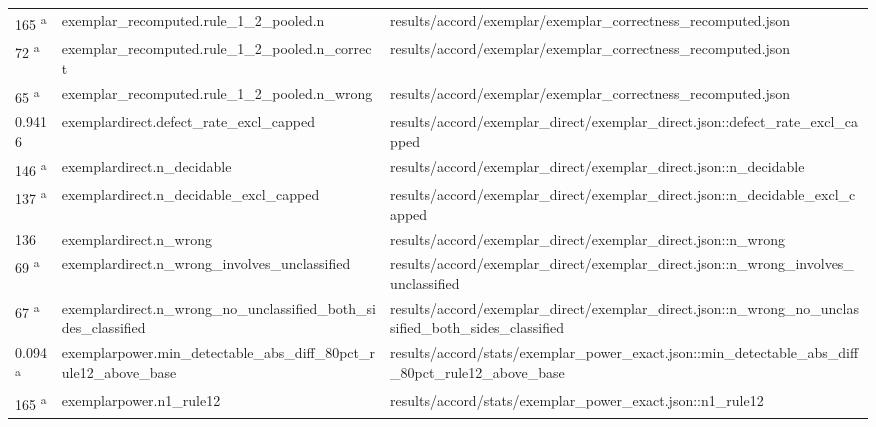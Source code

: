 \begin{longtable}{@{}p{0.7in}p{1.9in}p{2.6in}@{}}
165 \textsuperscript{a} & exemplar\_recomputed.\allowbreak{}rule\_1\_2\_pooled.\allowbreak{}n & results/\allowbreak{}accord/\allowbreak{}exemplar/\allowbreak{}exemplar\_correctness\_recomputed.\allowbreak{}json\\
72 \textsuperscript{a} & exemplar\_recomputed.\allowbreak{}rule\_1\_2\_pooled.\allowbreak{}n\_correct & results/\allowbreak{}accord/\allowbreak{}exemplar/\allowbreak{}exemplar\_correctness\_recomputed.\allowbreak{}json\\
65 \textsuperscript{a} & exemplar\_recomputed.\allowbreak{}rule\_1\_2\_pooled.\allowbreak{}n\_wrong & results/\allowbreak{}accord/\allowbreak{}exemplar/\allowbreak{}exemplar\_correctness\_recomputed.\allowbreak{}json\\
0.9416 & exemplardirect.\allowbreak{}defect\_rate\_excl\_capped & results/\allowbreak{}accord/\allowbreak{}exemplar\_direct/\allowbreak{}exemplar\_direct.\allowbreak{}json::defect\_rate\_excl\_capped\\
146 \textsuperscript{a} & exemplardirect.\allowbreak{}n\_decidable & results/\allowbreak{}accord/\allowbreak{}exemplar\_direct/\allowbreak{}exemplar\_direct.\allowbreak{}json::n\_decidable\\
137 \textsuperscript{a} & exemplardirect.\allowbreak{}n\_decidable\_excl\_capped & results/\allowbreak{}accord/\allowbreak{}exemplar\_direct/\allowbreak{}exemplar\_direct.\allowbreak{}json::n\_decidable\_excl\_capped\\
136 & exemplardirect.\allowbreak{}n\_wrong & results/\allowbreak{}accord/\allowbreak{}exemplar\_direct/\allowbreak{}exemplar\_direct.\allowbreak{}json::n\_wrong\\
69 \textsuperscript{a} & exemplardirect.\allowbreak{}n\_wrong\_involves\_unclassified & results/\allowbreak{}accord/\allowbreak{}exemplar\_direct/\allowbreak{}exemplar\_direct.\allowbreak{}json::n\_wrong\_involves\_unclassified\\
67 \textsuperscript{a} & exemplardirect.\allowbreak{}n\_wrong\_no\_unclassified\_both\_sides\_classified & results/\allowbreak{}accord/\allowbreak{}exemplar\_direct/\allowbreak{}exemplar\_direct.\allowbreak{}json::n\_wrong\_no\_unclassified\_both\_sides\_classified\\
0.094 \textsuperscript{a} & exemplarpower.\allowbreak{}min\_detectable\_abs\_diff\_80pct\_rule12\_above\_base & results/\allowbreak{}accord/\allowbreak{}stats/\allowbreak{}exemplar\_power\_exact.\allowbreak{}json::min\_detectable\_abs\_diff\_80pct\_rule12\_above\_base\\
165 \textsuperscript{a} & exemplarpower.\allowbreak{}n1\_rule12 & results/\allowbreak{}accord/\allowbreak{}stats/\allowbreak{}exemplar\_power\_exact.\allowbreak{}json::n1\_rule12\\

\end{longtable}
